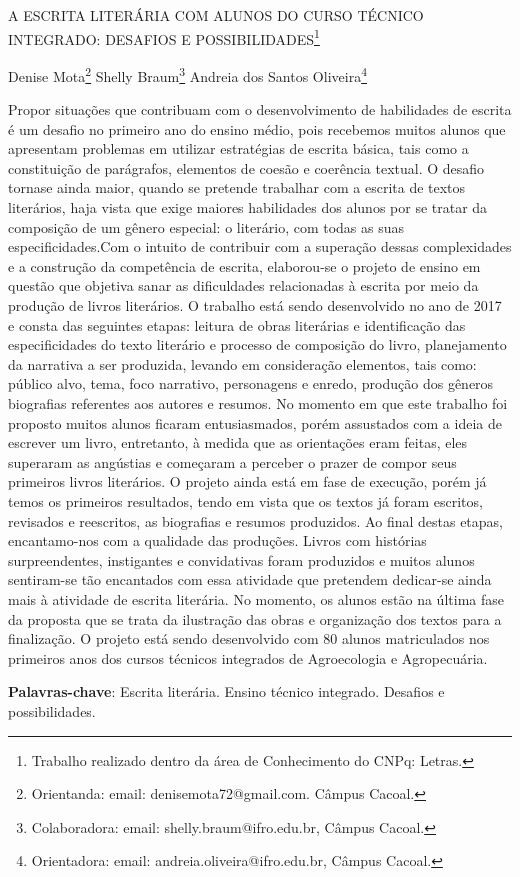 \documentclass[article,12pt,onesidea,4paper,english,brazil]{abntex2}
\begin{document}
	
	
	\frenchspacing 
	
	\begin{center}
		\LARGE A ESCRITA LITERÁRIA COM ALUNOS DO CURSO TÉCNICO INTEGRADO:
		DESAFIOS E POSSIBILIDADES\footnote{Trabalho realizado dentro da área de Conhecimento do CNPq: Letras.}
		
		\normalsize
		Denise Mota\footnote{Orientanda: email: denisemota72@gmail.com. Câmpus Cacoal.} 
	Shelly Braum\footnote{Colaboradora: email: shelly.braum@ifro.edu.br, Câmpus Cacoal.} 
	Andreia dos Santos Oliveira\footnote{Orientadora: email: andreia.oliveira@ifro.edu.br, Câmpus Cacoal.} 
		\end{center}
	
	\noindent Propor situações que contribuam com o desenvolvimento de habilidades de escrita é
	um desafio no primeiro ano do ensino médio, pois recebemos muitos alunos que
	apresentam problemas em utilizar estratégias de escrita básica, tais como a
	constituição de parágrafos, elementos de coesão e coerência textual. O desafio tornase
	ainda maior, quando se pretende trabalhar com a escrita de textos literários, haja
	vista que exige maiores habilidades dos alunos por se tratar da composição de um
	gênero especial: o literário, com todas as suas especificidades.Com o intuito de
	contribuir com a superação dessas complexidades e a construção da competência
	de escrita, elaborou-se o projeto de ensino em questão que objetiva sanar as
	dificuldades relacionadas à escrita por meio da produção de livros literários. O
	trabalho está sendo desenvolvido no ano de 2017 e consta das seguintes etapas:
	leitura de obras literárias e identificação das especificidades do texto literário e
	processo de composição do livro, planejamento da narrativa a ser produzida,
	levando em consideração elementos, tais como: público alvo, tema, foco narrativo,
	personagens e enredo, produção dos gêneros biografias referentes aos autores e
	resumos. No momento em que este trabalho foi proposto muitos alunos ficaram
	entusiasmados, porém assustados com a ideia de escrever um livro, entretanto, à
	medida que as orientações eram feitas, eles superaram as angústias e começaram a
	perceber o prazer de compor seus primeiros livros literários. O projeto ainda está em
	fase de execução, porém já temos os primeiros resultados, tendo em vista que os
	textos já foram escritos, revisados e reescritos, as biografias e resumos produzidos.
	Ao final destas etapas, encantamo-nos com a qualidade das produções. Livros com
	histórias surpreendentes, instigantes e convidativas foram produzidos e muitos
	alunos sentiram-se tão encantados com essa atividade que pretendem dedicar-se
	ainda mais à atividade de escrita literária. No momento, os alunos estão na última
	fase da proposta que se trata da ilustração das obras e organização dos textos para
	a finalização. O projeto está sendo desenvolvido com 80 alunos matriculados nos
	primeiros anos dos cursos técnicos integrados de Agroecologia e Agropecuária.
	
	\vspace{\onelineskip}
	
	\noindent
	\textbf{Palavras-chave}: Escrita literária. Ensino técnico integrado. Desafios e possibilidades.
	
\end{document}
